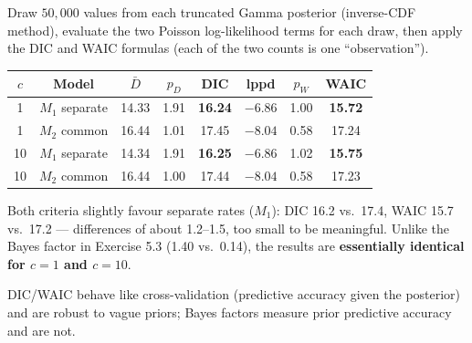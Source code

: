 \documentclass[11pt]{article}
\begin{document}
\solution
{} Draw $50{,}000$ values from each truncated Gamma posterior (inverse-CDF method), evaluate the two Poisson log-likelihood terms for each draw, then apply the DIC and WAIC formulas (each of the two counts is one ``observation'').
\begin{center}
\begin{tabular}{cc|ccc|ccc}\toprule
$c$ & Model & $\bar D$ & $p_D$ & DIC & lppd & $p_W$ & WAIC\\\midrule
1 & $M_1$ separate & 14.33 & 1.91 & \textbf{16.24} & $-6.86$ & 1.00 & \textbf{15.72}\\
1 & $M_2$ common & 16.44 & 1.01 & 17.45 & $-8.04$ & 0.58 & 17.24\\\midrule
10 & $M_1$ separate & 14.34 & 1.91 & \textbf{16.25} & $-6.86$ & 1.02 & \textbf{15.75}\\
10 & $M_2$ common & 16.44 & 1.00 & 17.44 & $-8.04$ & 0.58 & 17.23\\\bottomrule
\end{tabular}
\end{center}

\begin{answer}
Both criteria slightly favour separate rates ($M_1$): DIC 16.2 vs.\ 17.4, WAIC 15.7 vs.\ 17.2 --- differences of about 1.2--1.5, too small to be meaningful. Unlike the Bayes factor in Exercise 5.3 (1.40 vs.\ 0.14), the results are \textbf{essentially identical for $c=1$ and $c=10$}.
\end{answer}

\begin{takeaway}
DIC/WAIC behave like cross-validation (predictive accuracy given the posterior) and are robust to vague priors; Bayes factors measure prior predictive accuracy and are not.
\end{takeaway}

\end{document}
